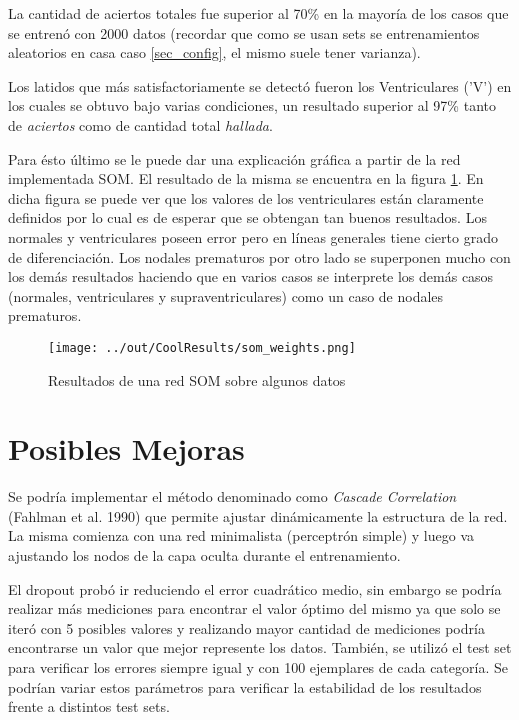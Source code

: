 \documentclass[conference]{IEEEtran}
\theoremstyle{definition}
\begin{document}
La cantidad de aciertos totales fue superior al 70\% en la mayor\'{i}a de los casos que se entren\'{o} con 2000 datos (recordar que como se usan sets se entrenamientos aleatorios en casa caso \ref{sec_config}, el mismo suele tener varianza).

Los latidos que m\'{a}s satisfactoriamente se detect\'{o} fueron los Ventriculares ('V') en los cuales se obtuvo bajo varias condiciones, un resultado superior al 97\% tanto de \textit{aciertos} como de cantidad total \textit{hallada}.

Para \'{e}sto \'{u}ltimo se le puede dar una explicaci\'{o}n gr\'{a}fica a partir de la red implementada SOM. El resultado de la misma se encuentra en la figura \ref{fig_som}. En dicha figura se puede ver que los valores de los ventriculares est\'{a}n claramente definidos por lo cual es de esperar que se obtengan tan buenos resultados. Los normales y ventriculares poseen error pero en l\'{i}neas generales tiene cierto grado de diferenciaci\'{o}n. Los nodales prematuros por otro lado se superponen mucho con los dem\'{a}s resultados haciendo que en varios casos se interprete los dem\'{a}s casos (normales, ventriculares y supraventriculares) como un caso de nodales prematuros.

\begin{figure}[H]
	\centering
	\texttt{[image: ../out/CoolResults/som\_weights.png]}
	\caption{Resultados de una red SOM sobre algunos datos}
	\label{fig_som}
\end{figure}

\section{Posibles Mejoras}

Se podr\'{i}a implementar el m\'{e}todo denominado como \textit{Cascade Correlation} (Fahlman et al. 1990) que permite ajustar din\'{a}micamente la estructura de la red. La misma comienza con una red minimalista (perceptr\'{o}n simple) y luego va ajustando los nodos de la capa oculta durante el entrenamiento.

El dropout prob\'{o} ir reduciendo el error cuadr\'{a}tico medio, sin embargo se podr\'{i}a realizar m\'{a}s mediciones para encontrar el valor \'{o}ptimo del mismo ya que solo se iter\'{o} con 5 posibles valores y realizando mayor cantidad de mediciones podr\'{i}a encontrarse un valor que mejor represente los datos. Tambi\'{e}n, se utiliz\'{o} el test set para verificar los errores siempre igual y con 100 ejemplares de cada categor\'{i}a. Se podr\'{i}an variar estos par\'{a}metros para verificar la estabilidad de los resultados frente a distintos test sets.
\end{document}
